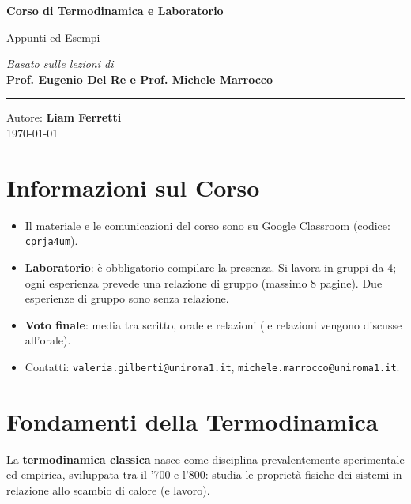 \documentclass[11pt, a4paper, openright]{book}
\theoremstyle{plain}
\theoremstyle{definition}
\theoremstyle{remark}
\begin{document}
\begin{titlepage}
    \centering
    \vspace*{4cm}

    \Huge
    \textbf{Corso di Termodinamica e Laboratorio}

    \vspace{0.5cm}
    \LARGE
    Appunti ed Esempi

    \vspace{1.5cm}

    \textit{Basato sulle lezioni di} \\
    \Large \textbf{Prof. Eugenio Del Re e Prof. Michele Marrocco}

    \vfill

    \rule{\linewidth}{0.5pt}
    \vspace{0.5cm}

    \large
    Autore: \textbf{Liam Ferretti} \\
    \today

\end{titlepage}

\tableofcontents

\chapter{Informazioni sul Corso}
\begin{itemize}
    \item Il materiale e le comunicazioni del corso sono su Google Classroom (codice: \texttt{cprja4um}).
    \item \textbf{Laboratorio}: è obbligatorio compilare la presenza. Si lavora in gruppi da 4; ogni esperienza prevede una relazione di gruppo (massimo 8 pagine). Due esperienze di gruppo sono senza relazione.
    \item \textbf{Voto finale}: media tra scritto, orale e relazioni (le relazioni vengono discusse all'orale).
    \item Contatti: \texttt{valeria.gilberti@uniroma1.it}, \texttt{michele.marrocco@uniroma1.it}.
\end{itemize}

\chapter{Fondamenti della Termodinamica}
La \textbf{termodinamica classica} nasce come disciplina prevalentemente sperimentale ed empirica, sviluppata tra il '700 e l'800: studia le proprietà fisiche dei sistemi in relazione allo scambio di calore (e lavoro).
\end{document}
